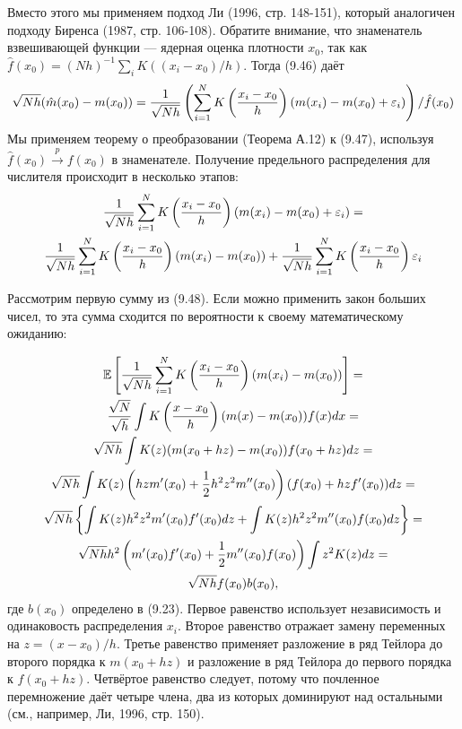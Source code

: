 Вместо этого мы применяем подход Ли (1996, стр. 148-151), который аналогичен подходу Биренса (1987, стр. 106-108). Обратите внимание, что знаменатель взвешивающей функции --- ядерная оценка плотности $x_0$, так как $\hat{f}(x_0) = (Nh)^{-1} \sum_i K((x_i - x_0)/h)$. Тогда (9.46) даёт
\begin{equation}
\sqrt{Nh}(\hat{m}(x_0) - m(x_0)) = \frac{1}{\sqrt{Nh}} \left( \sum_{i=1}^N K \left( \frac{x_i - x_0}{h} \right)(m(x_i) - m(x_0) + \varepsilon_i) \right) / \hat{f}(x_0)
\end{equation}
Мы применяем теорему о преобразовании (Теорема А.12) к (9.47), используя $\hat{f}(x_0) \stackrel{p}{\rightarrow} f(x_0)$ в знаменателе. Получение предельного распределения для числителя происходит в несколько этапов:
\begin{multline}
\frac{1}{\sqrt{Nh}} \sum_{i=1}^N K \left( \frac{x_i - x_0}{h} \right)(m(x_i) - m(x_0) + \varepsilon_i) = \\
 \frac{1}{\sqrt{Nh}} \sum_{i=1}^N K \left( \frac{x_i - x_0}{h} \right)(m(x_i) - m(x_0)) +  \frac{1}{\sqrt{Nh}} \sum_{i=1}^N K \left( \frac{x_i - x_0}{h} \right)\varepsilon_i
\end{multline}

Рассмотрим первую сумму из (9.48). Если можно применить закон больших чисел, то эта сумма сходится по вероятности к своему математическому ожиданию:

\begin{multline}
\mathbb{E} \left[ \frac{1}{\sqrt{Nh}} \sum_{i=1}^N K \left( \frac{x_i - x_0}{h} \right)(m(x_i) - m(x_0)) \right] = \\
\frac{\sqrt{N}}{\sqrt{h}} \int K \left( \frac{x - x_0}{h} \right)(m(x) - m(x_0))f(x)dx = \\
\sqrt{Nh} \int K(z)(m(x_0 + hz) - m(x_0))f(x_0 + hz)dz = \\
\sqrt{Nh} \int K(z) \left( hzm'(x_0)+ \frac{1}{2}h^2z^2m''(x_0) \right) (f(x_0) + hzf'(x_0))dz =  \\
\sqrt{Nh} \left\{ \int K(z)h^2z^2 m'(x_0)f'(x_0)dz + \int K(z) h^2z^2m''(x_0)f(x_0)dz \right\} =  \\
\sqrt{Nh}h^2 \left( m'(x_0)f'(x_0) + \frac{1}{2} m''(x_0) f(x_0) \right) \int z^2 K(z)dz  = \\
\sqrt{Nh}f(x_0)b(x_0),
\end{multline}
где $b(x_0)$ определено в (9.23). Первое равенство использует независимость и одинаковость распределения $x_i$. Второе равенство отражает замену переменных на $z = (x - x_0)/h$. Третье равенство применяет разложение в ряд Тейлора до второго порядка к $m(x_0 + hz)$ и разложение в ряд Тейлора до первого порядка к $f(x_0 + hz)$. Четвёртое равенство следует, потому что почленное перемножение даёт четыре члена, два из которых доминируют над остальными (см., например, Ли, 1996, стр. 150).

